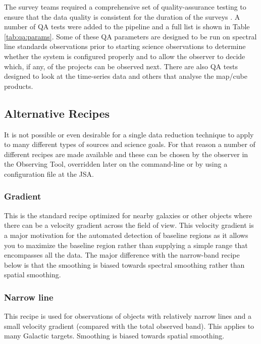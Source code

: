 \documentclass[a4paper,fleqn,usenatbib]{mnras}
\begin{document}
The survey teams required a comprehensive set of quality-assurance
testing to ensure that the data quality is consistent for the duration
of the surveys \citep{2008JCMTLSQA}. A number of QA tests were added
to the pipeline and a full list is shown in Table
\ref{tab:qa:params}. Some of these QA parameters are designed to be
run on spectral line standards observations prior to starting science
observations to determine whether the system is configured properly
and to allow the observer to decide which, if any, of the projects can
be observed next. There are also QA tests designed to look at the
time-series data and others that analyse the map/cube products.

\subsection{Alternative Recipes}
\label{sec:alt}

It is not possible or even desirable for a single data reduction
technique to apply to many different types of sources and science
goals. For that reason a number of different recipes are made
available and these can be chosen by the observer in the Observing
Tool, overridden later on the command-line or by using a
configuration file at the JSA.

\subsubsection{Gradient}

This is the standard recipe optimized for nearby galaxies or other
objects where there can be a velocity gradient across
the field of view. This velocity gradient is a major motivation for the
automated detection of baseline regions as it allows you to maximize
the baseline region rather than supplying a simple range that
encompasses all the data. The major difference with the narrow-band
recipe below is that the smoothing is biased towards spectral smoothing
rather than spatial smoothing.

\subsubsection{Narrow line}

This recipe is used for observations of objects with relatively narrow
lines and a small velocity gradient (compared with the total observed
band). This applies to many Galactic targets. Smoothing is biased
towards spatial smoothing.
\end{document}
